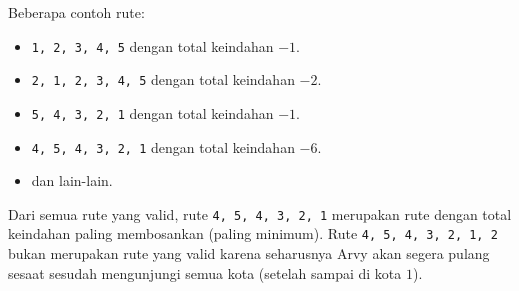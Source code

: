 \documentclass{article}
\begin{document}
Beberapa contoh rute:
\begin{itemize}
    \item \lstinline{1, 2, 3, 4, 5} dengan total keindahan $-1$.
    \item \lstinline{2, 1, 2, 3, 4, 5} dengan total keindahan $-2$.
    \item \lstinline{5, 4, 3, 2, 1} dengan total keindahan $-1$.
    \item \lstinline{4, 5, 4, 3, 2, 1} dengan total keindahan $-6$.
    \item dan lain-lain.
\end{itemize}

Dari semua rute yang valid, rute \lstinline{4, 5, 4, 3, 2, 1} merupakan rute dengan total keindahan paling membosankan (paling minimum).
Rute \lstinline{4, 5, 4, 3, 2, 1, 2} bukan merupakan rute yang valid karena seharusnya Arvy akan segera pulang sesaat sesudah mengunjungi semua kota (setelah sampai di kota $1$).

\pagebreak
\end{document}
